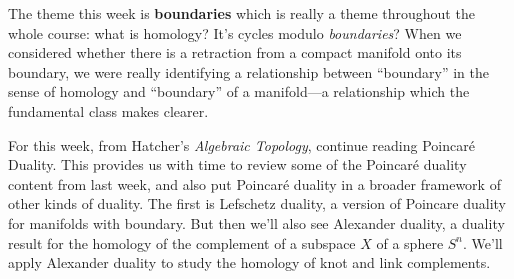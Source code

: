 \documentclass{homework}
\author{Jim Fowler}
\date{Week 12: Boundaries}
\begin{document}
\maketitle

The theme this week is \textbf{boundaries} which is really a theme
throughout the whole course: what is homology? It's cycles modulo
\textit{boundaries}?  When we considered whether there is a retraction
from a compact manifold onto its boundary, we were really identifying
a relationship between ``boundary'' in the sense of homology and
``boundary'' of a manifold---a relationship which the fundamental
class makes clearer.

For this week, from Hatcher's \textit{Algebraic Topology}, continue
reading  Poincar\'e Duality.  This provides us with
time to review some of the Poincar\'e duality content from last week,
and also put Poincar\'e duality in a broader framework of other kinds
of duality.  The first is Lefschetz duality, a version of Poincar\;e
duality for manifolds with boundary.  But then we'll also see
Alexander duality, a duality result for the homology of the complement
of a subspace $X$ of a sphere $S^n$.  We'll apply Alexander duality to
study the homology of knot and link complements.
\end{document}
